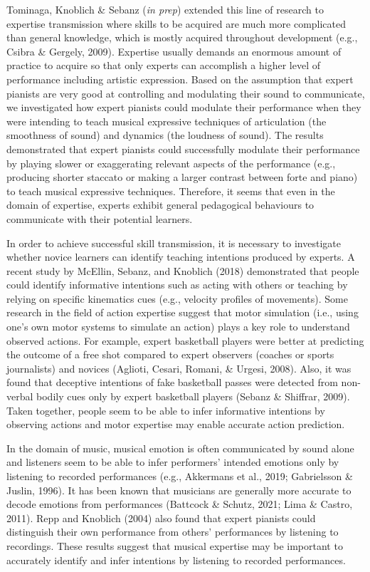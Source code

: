 \documentclass[
  man,floatsintext]{apa6}
\begin{document}
Tominaga, Knoblich \& Sebanz (\emph{in prep}) extended this line of research to expertise transmission where skills to be acquired are much more complicated than general knowledge, which is mostly acquired throughout development (e.g., Csibra \& Gergely, 2009). Expertise usually demands an enormous amount of practice to acquire so that only experts can accomplish a higher level of performance including artistic expression. Based on the assumption that expert pianists are very good at controlling and modulating their sound to communicate, we investigated how expert pianists could modulate their performance when they were intending to teach musical expressive techniques of articulation (the smoothness of sound) and dynamics (the loudness of sound). The results demonstrated that expert pianists could successfully modulate their performance by playing slower or exaggerating relevant aspects of the performance (e.g., producing shorter staccato or making a larger contrast between forte and piano) to teach musical expressive techniques. Therefore, it seems that even in the domain of expertise, experts exhibit general pedagogical behaviours to communicate with their potential learners.

In order to achieve successful skill transmission, it is necessary to investigate whether novice learners can identify teaching intentions produced by experts. A recent study by McEllin, Sebanz, and Knoblich (2018) demonstrated that people could identify informative intentions such as acting with others or teaching by relying on specific kinematics cues (e.g., velocity profiles of movements). Some research in the field of action expertise suggest that motor simulation (i.e., using one's own motor systems to simulate an action) plays a key role to understand observed actions. For example, expert basketball players were better at predicting the outcome of a free shot compared to expert observers (coaches or sports journalists) and novices (Aglioti, Cesari, Romani, \& Urgesi, 2008). Also, it was found that deceptive intentions of fake basketball passes were detected from non-verbal bodily cues only by expert basketball players (Sebanz \& Shiffrar, 2009). Taken together, people seem to be able to infer informative intentions by observing actions and motor expertise may enable accurate action prediction.

In the domain of music, musical emotion is often communicated by sound alone and listeners seem to be able to infer performers' intended emotions only by listening to recorded performances (e.g., Akkermans et al., 2019; Gabrielsson \& Juslin, 1996). It has been known that musicians are generally more accurate to decode emotions from performances (Battcock \& Schutz, 2021; Lima \& Castro, 2011). Repp and Knoblich (2004) also found that expert pianists could distinguish their own performance from others' performances by listening to recordings. These results suggest that musical expertise may be important to accurately identify and infer intentions by listening to recorded performances.
\end{document}

